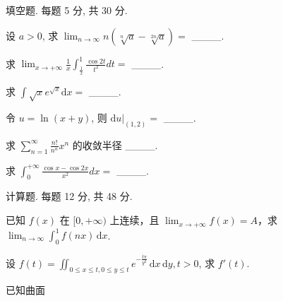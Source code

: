 \par{}
填空题. 每题 5 分, 共 30 分.\par
设 $a > 0$, 求 $\lim_{n \to \infty} n(\sqrt[n]{a} - \sqrt[2n]{a}) =$ \_\_\_\_.\par
求  $\lim_{x\to+\infty}\frac{1}{x}\int_{\frac{1}{x}}^{1}\frac{\cos2t}{t^{2}}dt=$  \_\_\_\_.\par
求 $\int \sqrt{x} e^{\sqrt{x}} \mathrm{d}x =$ \_\_\_\_.\par
令 $u = \ln (x + y)$, 则 $\mathrm{d}u|_{(1,2)} =$ \_\_\_\_.\par
求  $\sum_{n=1}^{\infty}\frac{n!}{n^{n}}x^{n}$  的收敛半径 \_\_\_\_.\par
求  $\int_{0}^{+\infty}\frac{\cos x - \cos 2x}{x^{2}}dx=$  \_\_\_\_.\par
\par{}
计算题. 每题 12 分, 共 48 分.\par
已知 $f(x)$ 在 $[0, +\infty)$ 上连续，且 $\lim_{x \to +\infty} f(x) = A$，求 $\lim_{n \to \infty} \int_0^1 f(nx) \, \mathrm{d}x$.\par
设 $f(t) = \iint_{0 \leq x \leq t, 0 \leq y \leq t} e^{-\frac{t\pi}{y^2}} \, \mathrm{d}x \, \mathrm{d}y, t > 0$, 求 $f'(t)$.\par
\par{}
已知曲面\par
\nopagebreak[4]
